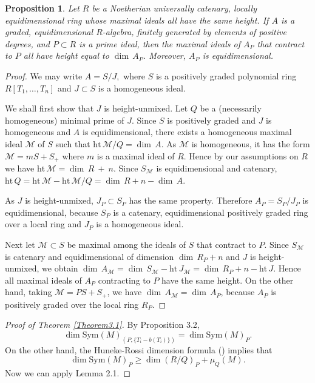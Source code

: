\documentclass{proc-l}
\newcommand{\hgt}{\mathrm{ht}}
\newcommand{\Sym}{\mathrm{ Sym}}
\newtheorem{Proposition}[Theorem]{Proposition}
\theoremstyle{remark}
\theoremstyle{definition}
\begin{document}
\begin{Proposition}\label{Proposition2.2}  
Let $R$ be a Noetherian universally catenary, locally equidimensional 
ring whose maximal ideals all have the same height.
If $A$ is a  graded, equidimensional $R$-algebra, finitely
generated by elements of positive degrees, and $P\subset R$ is a prime
ideal, then the maximal ideals of
$A_P$ that contract to $P$ all have height equal to $\dim \, A_P$.
Moreover, $A_P$ is equidimensional.
\end{Proposition}
\begin{proof}
We may write $A = S/J,$ where
$S$ is a positively graded polynomial ring $R[T_1,\dots,T_n]$ and 
$J \subset S$ is a homogeneous ideal.

We shall first show that $J$ is height-unmixed.  Let $Q$ be a
(necessarily homogeneous) minimal prime of $J$. Since $S$ is positively 
graded and $J$ is homogeneous and $A$ is 
equidimensional, there exists a homogeneous maximal  ideal ${\mathcal M}$  of $S$
such that
$\hgt \, {\mathcal M}/Q = \dim \, A$.   As ${\mathcal M}$ is homogeneous, it has the form
${\mathcal M} = mS+S_+$ where $m$ is a maximal ideal of $R$. Hence by our
assumptions on $R$ we have $\hgt \, {\mathcal M} = \dim \, R\ +\ n$. Since 
$S_{\mathcal M}$ is
equidimensional and catenary,  $ \hgt \, Q = \hgt \, {\mathcal M} - 
\hgt \, {\mathcal M}/Q = \dim \, R + n -\dim \, A$.


As $J$ is height-unmixed, $J_P\subset S_P$ has the same property.
Therefore  $A_P = S_P / J_P$ is equidimensional, because $S_P$ is
a catenary, equidimensional positively graded ring over a local ring and 
$J_P$ is a homogeneous ideal.

Next let ${\mathcal M} \subset S$ be  maximal among the ideals of  $S$ 
that contract to $P$.  Since $S_{\mathcal M}$ is catenary and 
equidimensional of 
dimension $\dim \, R_P + n$ and $J$ is height-unmixed, we obtain 
$\dim \, A_{\mathcal M} = \dim \, S_{\mathcal M} - \hgt \, J_{\mathcal M} = 
\dim \,  R_P + n - \hgt \, J$.  Hence all maximal ideals of $A_P$ 
contracting to $P$ have the same height.  On the other hand, taking 
${\mathcal M} = PS + S_+$, we have $\dim \,
A_{\mathcal M} = \dim \, A_P$, because 
$A_P$ is positively graded over the local ring $R_P$.
\end{proof}

\begin{proof}[Proof of Theorem \ref{Theorem3.1}] 
By Proposition 3.2,
\[\dim \Sym(M)_{(P,\{T_i-b(T_i)\})}=\dim \Sym(M)_P.\]
On the other hand, the Huneke-Rossi dimension formula (\cite[Theorem 2.6]{HR}) 
implies that
\[\dim \Sym(M)_P\ge \dim(R/Q)_P+\mu_Q(M).\]
Now we can apply Lemma 2.1.
\end{proof}
\end{document}
